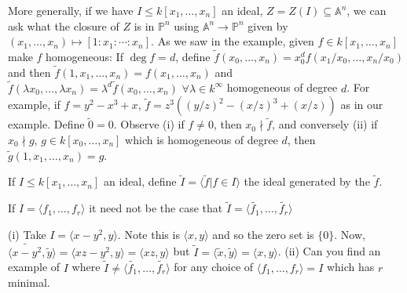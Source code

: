 \documentclass{article}
\newcommand{\A}{\mathbb{A}}
\newcommand{\proj}{\mathbb{P}}
\begin{document}
More generally, if we have $I \leq k[x_1, \dotsc, x_n]$ an ideal, $Z = Z(I) \subseteq \A^n$, we can ask what the closure of $Z$ is in $\proj^n$ using $\A^n \to \proj^n$ given by $(x_1, \dotsc, x_n) \mapsto [1:x_1:\dotsm:x_n]$.
As we saw in the example, given $f \in k[x_1, \dotsc, x_n]$ make $f$ homogeneous:
If $\deg f = d$, define $\tilde{f}(x_0, \dotsc, x_n) = x_0^d f(x_1/x_0, \dotsc, x_n/x_0)$ and then $\tilde{f}(1, x_1, \dotsc, x_n) = f(x_1, \dotsc, x_n)$ and $\tilde{f}(\lambda x_0, \dotsc, \lambda x_n) = \lambda^d \tilde{f}(x_0, \dotsc, x_n)$ $\forall \lambda \in k^\infty$ homogeneous of degree $d$.
For example, if $f = y^2 - x^3 + x$, $\tilde{f} = z^3 ((y/z)^2 - (x/z)^3 + (x/z))$ as in our example.
Define $\tilde{0} = 0$.
Observe
(i) if $f \neq 0$, then $x_0 \nmid \tilde{f}$, and conversely
(ii) if $x_0 \nmid g$, $g \in k[x_0, \dotsc, x_n]$ which is homogeneous of degree $d$, then $\tilde{g}(1, x_1, \dotsc, x_n) = g$.
\begin{defi}
    If $I \leq k[x_1, \dotsc, x_n]$ an ideal, define $\tilde{I} = \langle \tilde{f} | f \in I \rangle$ the ideal generated by the $\tilde{f}$.
\end{defi}
\begin{warning}
    If $I = \langle f_1, \dotsc, f_r \rangle$ it need not be the case that $\tilde{I} = \langle \tilde{f_1}, \dotsc, \tilde{f_r}\rangle$
\end{warning}
\begin{eg}
    (i) Take $I = \langle x - y^2, y \rangle$. Note this is $\langle x, y \rangle$ and so the zero set is $\{0\}$. Now, $\langle \widetilde{x - y^2}, \tilde{y} \rangle = \langle xz - y^2, y \rangle = \langle xz, y\rangle$ but $\tilde{I} = \langle \tilde{x}, \tilde{y} \rangle = \langle x, y \rangle$.
    (ii)  Can you find an example of $I$ where $\tilde{I} \neq \langle \tilde{f_1}, \dotsc, \tilde{f_r} \rangle$ for any choice of $\langle f_1, \dotsc, f_r \rangle = I$ which has $r$ minimal.
\end{eg}
\end{document}

